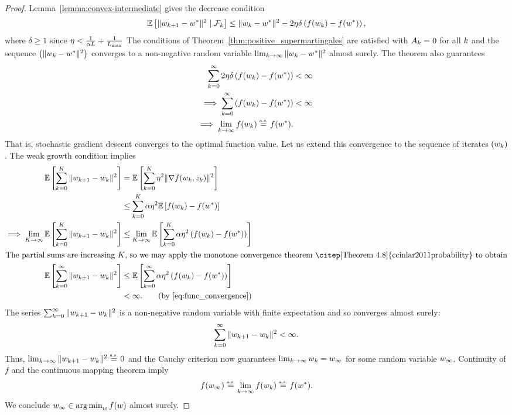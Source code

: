 \wgcAlmostSure*
\begin{proof}
    Lemma~\ref{lemma:convex-intermediate} gives the decrease condition
    \begin{align*}
        \mathbb{E}\left[\|w_{k+1} - w^*\|^2 \mid \mathcal{F}_k\right] \leq  \|w_k - w^*\|^2 - 2 \eta \delta \left(f(w_k) - f(w^*)\right),
    \end{align*}
    where \( \delta \geq 1 \) since \( \eta < \frac{1}{\alpha L} + \frac{1}{L_{\text{max}}} \)
    The conditions of Theorem~\ref{thm:positive_supermartingales} are satisfied with \( A_k = 0 \) for all \( k \) and the sequence \( \left(\|w_k - w^*\|^2\right) \) converges to a non-negative random variable \(\lim_{k \rightarrow \infty} \|w_k - w^*\|^2 \) almost surely.
    The theorem also guarantees
    \begin{align}
        \sum_{k=0}^{\infty} 2\eta \delta \left(f(w_k) - f(w^*)\right) &< \infty \nonumber \\
        \implies \sum_{k=0}^{\infty} \left(f(w_k) - f(w^*)\right) &< \infty~\label{eq:func_convergence}\\
        \implies \lim_{k \rightarrow \infty} f(w_k) \stackrel{\text{\rm\tiny a.s.}}{=} f(w^*). \nonumber
    \end{align}
    That is, stochastic gradient descent converges to the optimal function value. 
    Let us extend this convergence to the sequence of iterates \( \left(w_k\right) \).
    The weak growth condition implies 
    \begin{align*}
        \E\sbr{\sum_{k=0}^{K} \norm{\wkk - \wk}^2} &= \E\sbr{\sum_{k=0}^{K} \eta^2 \norm{\grad(\wk, \zk)}^2}\\
                                                   &\leq \sum_{k=0}^{K} \wgc \eta^2 \E\sbr{f(\wk) - f(\wopt)}\\
        \implies \lim_{K\rightarrow \infty} \E \sbr{\sum_{k=0}^{K} \norm{\wkk - \wk}^2} &\leq \lim_{K\rightarrow\infty} \E \sbr{\sum_{k=0}^{K} \wgc \eta^2 \rbr{f(\wk) - f(\wopt)}}\\
        \intertext{The partial sums are increasing \( K \), so we may apply the monotone convergence theorem~\citep[Theorem 4.8]{ccinlar2011probability} to obtain} 
        \E \sbr{\sum_{k=0}^{\infty} \norm{\wkk - \wk}^2} &\leq  \E \sbr{\sum_{k=0}^{\infty} \wgc \eta^2 \rbr{f(\wk) - f(\wopt)}}\\
                                                                  &< \infty. \tag{by \autoref{eq:func_convergence}}
    \end{align*}
    The series \(  \sum_{k=0}^{\infty} \|w_{k+1} - w_k\|^2 \) is a non-negative random variable with finite expectation and so converges almost surely: 
    \[ \sum_{k=0}^{\infty} \|w_{k+1} - w_k\|^2 < \infty. \]
    Thus, \( \lim_{k \rightarrow \infty} \|w_{k+1} - w_k\|^2 \stackrel{\text{\rm\tiny a.s.}}{=} 0 \) and the Cauchy criterion now guarantees \( \lim_{k \rightarrow \infty} w_k = w_\infty \) for some random variable \( w_\infty \).
    Continuity of \( f \) and the continuous mapping theorem imply 
    \[ f(w_\infty) \stackrel{\text{\rm\tiny a.s.}}{=} \lim_{k\rightarrow \infty} f(w_k) \stackrel{\text{\rm\tiny a.s.}}{=} f(w^*). \]
    We conclude \( w_\infty \in \mathop{\rm arg\,min}_w f(w) \) almost surely.
\end{proof}

